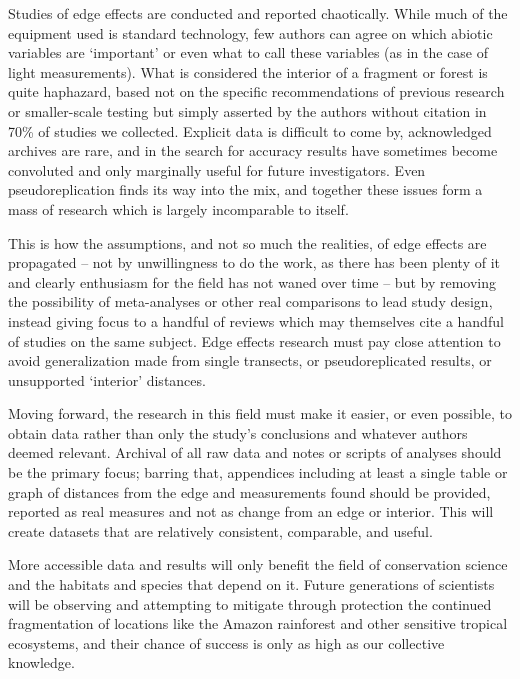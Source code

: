 \documentclass[
  man]{apa6}
\begin{document}
Studies of edge effects are conducted and reported chaotically. While much of the equipment used is standard technology, few authors can agree on which abiotic variables are `important' or even what to call these variables (as in the case of light measurements). What is considered the interior of a fragment or forest is quite haphazard, based not on the specific recommendations of previous research or smaller-scale testing but simply asserted by the authors without citation in 70\% of studies we collected. Explicit data is difficult to come by, acknowledged archives are rare, and in the search for accuracy results have sometimes become convoluted and only marginally useful for future investigators. Even pseudoreplication finds its way into the mix, and together these issues form a mass of research which is largely incomparable to itself.

This is how the assumptions, and not so much the realities, of edge effects are propagated -- not by unwillingness to do the work, as there has been plenty of it and clearly enthusiasm for the field has not waned over time -- but by removing the possibility of meta-analyses or other real comparisons to lead study design, instead giving focus to a handful of reviews which may themselves cite a handful of studies on the same subject. Edge effects research must pay close attention to avoid generalization made from single transects, or pseudoreplicated results, or unsupported `interior' distances.

Moving forward, the research in this field must make it easier, or even possible, to obtain data rather than only the study's conclusions and whatever authors deemed relevant. Archival of all raw data and notes or scripts of analyses should be the primary focus; barring that, appendices including at least a single table or graph of distances from the edge and measurements found should be provided, reported as real measures and not as change from an edge or interior. This will create datasets that are relatively consistent, comparable, and useful.

More accessible data and results will only benefit the field of conservation science and the habitats and species that depend on it. Future generations of scientists will be observing and attempting to mitigate through protection the continued fragmentation of locations like the Amazon rainforest and other sensitive tropical ecosystems, and their chance of success is only as high as our collective knowledge.

\newpage
\end{document}
